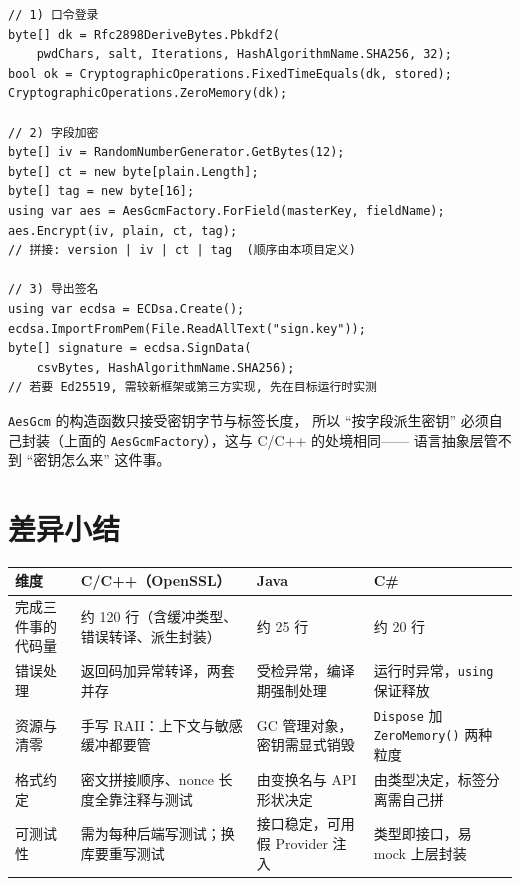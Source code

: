 \documentclass[12pt,a4paper,fontset=fandol]{ctexbook}
\newcommand{\Fn}[1]{\texttt{#1()}}
\newcommand{\Tp}[1]{\texttt{#1}}
\newcommand{\CSharp}{C\#}
\newcommand{\CppJava}{C/C++}
\begin{document}
\begin{lstlisting}[style=csharpstyle,caption={C\#：三个静态入口加一个 using}]
// 1) 口令登录
byte[] dk = Rfc2898DeriveBytes.Pbkdf2(
    pwdChars, salt, Iterations, HashAlgorithmName.SHA256, 32);
bool ok = CryptographicOperations.FixedTimeEquals(dk, stored);
CryptographicOperations.ZeroMemory(dk);

// 2) 字段加密
byte[] iv = RandomNumberGenerator.GetBytes(12);
byte[] ct = new byte[plain.Length];
byte[] tag = new byte[16];
using var aes = AesGcmFactory.ForField(masterKey, fieldName);
aes.Encrypt(iv, plain, ct, tag);
// 拼接: version | iv | ct | tag  (顺序由本项目定义)

// 3) 导出签名
using var ecdsa = ECDsa.Create();
ecdsa.ImportFromPem(File.ReadAllText("sign.key"));
byte[] signature = ecdsa.SignData(
    csvBytes, HashAlgorithmName.SHA256);
// 若要 Ed25519, 需较新框架或第三方实现, 先在目标运行时实测
\end{lstlisting}

\Tp{AesGcm} 的构造函数只接受密钥字节与标签长度，
所以 ``按字段派生密钥'' 必须自己封装（上面的
\Tp{AesGcmFactory}），这与 \CppJava{} 的处境相同——
语言抽象层管不到 ``密钥怎么来'' 这件事。
\section{差异小结}

\begin{footnotesize}
\begin{longtable}{@{}>{\raggedright\arraybackslash}p{}
                  >{\raggedright\arraybackslash}p{}
                  >{\raggedright\arraybackslash}p{}
                  >{\raggedright\arraybackslash}p{}@{}}
\toprule
\textbf{维度} & \textbf{\CppJava{}（OpenSSL）} & \textbf{Java} &
\textbf{\CSharp{}} \\
\midrule
完成三件事的代码量 &
约 120 行（含缓冲类型、错误转译、派生封装） &
约 25 行 & 约 20 行 \\
\addlinespace
错误处理 &
返回码加异常转译，两套并存 &
受检异常，编译期强制处理 &
运行时异常，\Tp{using} 保证释放 \\
\addlinespace
资源与清零 &
手写 RAII：上下文与敏感缓冲都要管 &
GC 管理对象，密钥需显式销毁 &
\Tp{Dispose} 加 \Fn{ZeroMemory} 两种粒度 \\
\addlinespace
格式约定 &
密文拼接顺序、nonce 长度全靠注释与测试 &
由变换名与 API 形状决定 &
由类型决定，标签分离需自己拼 \\
\addlinespace
可测试性 &
需为每种后端写测试；换库要重写测试 &
接口稳定，可用假 Provider 注入 &
类型即接口，易 mock 上层封装 \\
\bottomrule
\end{longtable}
\end{footnotesize}
\end{document}
